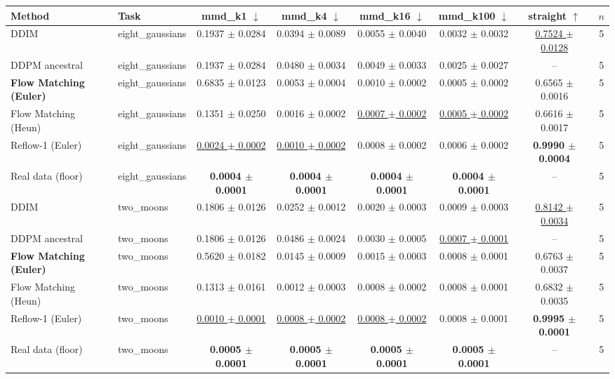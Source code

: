\begin{tabular}{llcccccc}
\toprule
Method & Task & mmd\_k1 $\downarrow$ & mmd\_k4 $\downarrow$ & mmd\_k16 $\downarrow$ & mmd\_k100 $\downarrow$ & straight $\uparrow$ & $n$ \\
\midrule
DDIM & eight\_gaussians & 0.1937 $\pm$ 0.0284 & 0.0394 $\pm$ 0.0089 & 0.0055 $\pm$ 0.0040 & 0.0032 $\pm$ 0.0032 & \underline{0.7524 $\pm$ 0.0128} & 5 \\
DDPM ancestral & eight\_gaussians & 0.1937 $\pm$ 0.0284 & 0.0480 $\pm$ 0.0034 & 0.0049 $\pm$ 0.0033 & 0.0025 $\pm$ 0.0027 & -- & 5 \\
\textbf{Flow Matching (Euler)} & eight\_gaussians & 0.6835 $\pm$ 0.0123 & 0.0053 $\pm$ 0.0004 & 0.0010 $\pm$ 0.0002 & 0.0005 $\pm$ 0.0002 & 0.6565 $\pm$ 0.0016 & 5 \\
Flow Matching (Heun) & eight\_gaussians & 0.1351 $\pm$ 0.0250 & 0.0016 $\pm$ 0.0002 & \underline{0.0007 $\pm$ 0.0002} & \underline{0.0005 $\pm$ 0.0002} & 0.6616 $\pm$ 0.0017 & 5 \\
Reflow-1 (Euler) & eight\_gaussians & \underline{0.0024 $\pm$ 0.0002} & \underline{0.0010 $\pm$ 0.0002} & 0.0008 $\pm$ 0.0002 & 0.0006 $\pm$ 0.0002 & \textbf{0.9990 $\pm$ 0.0004} & 5 \\
Real data (floor) & eight\_gaussians & \textbf{0.0004 $\pm$ 0.0001} & \textbf{0.0004 $\pm$ 0.0001} & \textbf{0.0004 $\pm$ 0.0001} & \textbf{0.0004 $\pm$ 0.0001} & -- & 5 \\
\midrule
DDIM & two\_moons & 0.1806 $\pm$ 0.0126 & 0.0252 $\pm$ 0.0012 & 0.0020 $\pm$ 0.0003 & 0.0009 $\pm$ 0.0003 & \underline{0.8142 $\pm$ 0.0034} & 5 \\
DDPM ancestral & two\_moons & 0.1806 $\pm$ 0.0126 & 0.0486 $\pm$ 0.0024 & 0.0030 $\pm$ 0.0005 & \underline{0.0007 $\pm$ 0.0001} & -- & 5 \\
\textbf{Flow Matching (Euler)} & two\_moons & 0.5620 $\pm$ 0.0182 & 0.0145 $\pm$ 0.0009 & 0.0015 $\pm$ 0.0003 & 0.0008 $\pm$ 0.0001 & 0.6763 $\pm$ 0.0037 & 5 \\
Flow Matching (Heun) & two\_moons & 0.1313 $\pm$ 0.0161 & 0.0012 $\pm$ 0.0003 & 0.0008 $\pm$ 0.0002 & 0.0008 $\pm$ 0.0001 & 0.6832 $\pm$ 0.0035 & 5 \\
Reflow-1 (Euler) & two\_moons & \underline{0.0010 $\pm$ 0.0001} & \underline{0.0008 $\pm$ 0.0002} & \underline{0.0008 $\pm$ 0.0002} & 0.0008 $\pm$ 0.0001 & \textbf{0.9995 $\pm$ 0.0001} & 5 \\
Real data (floor) & two\_moons & \textbf{0.0005 $\pm$ 0.0001} & \textbf{0.0005 $\pm$ 0.0001} & \textbf{0.0005 $\pm$ 0.0001} & \textbf{0.0005 $\pm$ 0.0001} & -- & 5 \\

\end{tabular}
